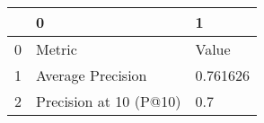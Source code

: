 \begin{tabular}{lll}
\toprule
{} &                       0 &         1 \\
\midrule
0 &                  Metric &     Value \\
1 &       Average Precision &  0.761626 \\
2 &  Precision at 10 (P@10) &       0.7 \\
\bottomrule
\end{tabular}
